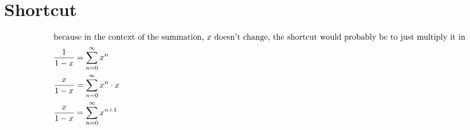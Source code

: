 \documentclass[12pt]{article}
\begin{document}
\section{Shortcut}
\begin{align}
  \intertext{because in the context of the summation, $x$ doesn't change, the shortcut would probably be to just multiply it in}
  \frac{1}{1-x}                    & =\sum_{n=0}^{\infty}x^{n}                                                           \\
  \frac{x}{1-x}                    & =\sum_{n=0}^{\infty}x^{n}\cdot x                                                    \\
  \frac{x}{1-x}                    & =\sum_{n=0}^{\infty}x^{n+1}                                                         
\end{align}
\end{document}
